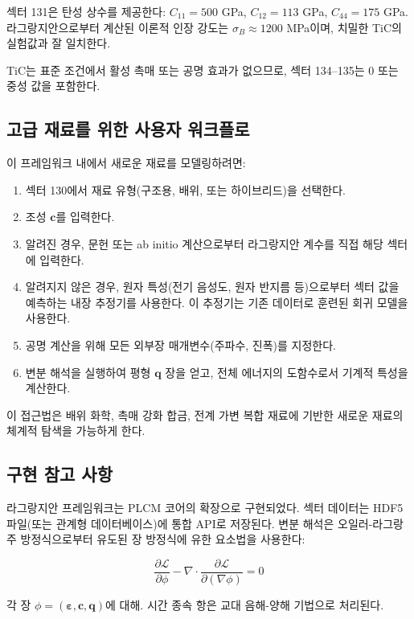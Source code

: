 \documentclass[12pt,a4paper]{article}
\begin{document}
	섹터 131은 탄성 상수를 제공한다: \(C_{11}=500\) GPa, \(C_{12}=113\) GPa, \(C_{44}=175\) GPa. 라그랑지안으로부터 계산된 이론적 인장 강도는 \(\sigma_B \approx 1200\) MPa이며, 치밀한 TiC의 실험값과 잘 일치한다.
	
	TiC는 표준 조건에서 활성 촉매 또는 공명 효과가 없으므로, 섹터 134–135는 0 또는 중성 값을 포함한다.
	
	\subsection{고급 재료를 위한 사용자 워크플로}
	\label{subsec:workflow}
	
	이 프레임워크 내에서 새로운 재료를 모델링하려면:
	
	\begin{enumerate}
		\item 섹터 130에서 재료 유형(구조용, 배위, 또는 하이브리드)을 선택한다.
		\item 조성 \(\mathbf{c}\)를 입력한다.
		\item 알려진 경우, 문헌 또는 ab initio 계산으로부터 라그랑지안 계수를 직접 해당 섹터에 입력한다.
		\item 알려지지 않은 경우, 원자 특성(전기 음성도, 원자 반지름 등)으로부터 섹터 값을 예측하는 내장 추정기를 사용한다. 이 추정기는 기존 데이터로 훈련된 회귀 모델을 사용한다.
		\item 공명 계산을 위해 모든 외부장 매개변수(주파수, 진폭)를 지정한다.
		\item 변분 해석을 실행하여 평형 \(\mathbf{q}\) 장을 얻고, 전체 에너지의 도함수로서 기계적 특성을 계산한다.
	\end{enumerate}
	
	이 접근법은 배위 화학, 촉매 강화 합금, 전계 가변 복합 재료에 기반한 새로운 재료의 체계적 탐색을 가능하게 한다.
	
	\subsection{구현 참고 사항}
	\label{subsec:implementation}
	
	라그랑지안 프레임워크는 PLCM 코어의 확장으로 구현되었다. 섹터 데이터는 HDF5 파일(또는 관계형 데이터베이스)에 통합 API로 저장된다. 변분 해석은 오일러-라그랑주 방정식으로부터 유도된 장 방정식에 유한 요소법을 사용한다:
	
	\[
	\frac{\partial \mathcal{L}}{\partial \phi} - \nabla \cdot \frac{\partial \mathcal{L}}{\partial (\nabla\phi)} = 0
	\]
	
	각 장 \(\phi = (\boldsymbol{\varepsilon}, \mathbf{c}, \mathbf{q})\)에 대해. 시간 종속 항은 교대 음해-양해 기법으로 처리된다.
	
\end{document}
